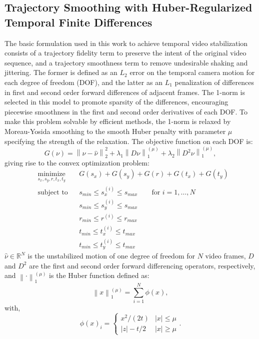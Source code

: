 \documentclass{article} %
\newcommand{\norm}[1]{\left\lVert#1\right\rVert}
\begin{document}
\subsection{Trajectory Smoothing with Huber-Regularized Temporal Finite Differences}
The basic formulation used in this work to achieve temporal video stabilization consists of a trajectory fidelity term to preserve the intent of the original video sequence, and a trajectory smoothness term to remove undesirable shaking and jittering. The former is defined as an $L_2$ error on the temporal camera motion for each degree of freedom (DOF), and the latter as an $L_1$ penalization of differences in first and second order forward differences of adjacent frames. The 1-norm is selected in this model to promote sparsity of the differences, encouraging piecewise smoothness in the first and second order derivatives of each DOF. To make this problem solvable by efficient methods, the 1-norm is relaxed by Moreau-Yosida smoothing to the smooth Huber penalty with parameter $\mu$ specifying the strength of the relaxation. The objective function on each DOF is:
\begin{equation*}
  G(\nu) = \norm{\nu - \hat{\nu}}_2^2 + \lambda_1 \norm{D \nu}_1^{(\mu)} + \lambda_2 \norm{D^2 \nu}_1^{(\mu)},
\end{equation*}
giving rise to the convex optimization problem:
\begin{align} \label{eq:optprob}
  & \underset{s_x, s_y, r, t_x, t_y}{\text{minimize}} & & G(s_x) + G(s_y) + G(r) + G(t_x) + G(t_y) \\
  & \text{subject to} & & s_{min} \le s_x^{(i)} \le s_{max}  \qquad{} \text{for }i=1,\dotsc,N \nonumber \\
  &                   & & s_{min} \le s_y^{(i)} \le s_{max} \nonumber \\
  &                   & & r_{min} \le r^{(i)}   \le r_{max} \nonumber \\
  &                   & & t_{min} \le t_x^{(i)} \le t_{max} \nonumber \\
  &                   & & t_{min} \le t_y^{(i)} \le t_{max} \nonumber
\end{align}
$\hat{\nu}\in \mathbb{R}^N$ is the unstabilized motion of one degree of freedom for $N$ video frames, $D$ and $D^2$ are the first and second order forward differencing operators, respectively, and $\norm{\cdot}_1^{(\mu)}$ is the Huber function defined as:
\begin{equation*}
  \norm{x}_1^{(\mu)} = \sum_{i=1}^N{\phi({x})},
\end{equation*}
with,
\begin{equation*}
  \phi(x)_i =
  \begin{cases}
    x^2/(2t)  & |x| \le \mu \\
   |z| - t/2  & |x| \ge \mu
  \end{cases}.
\end{equation*}
\end{document}
